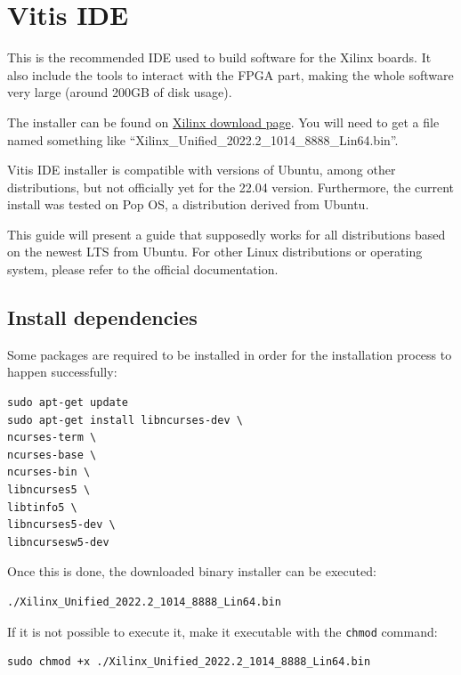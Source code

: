 \documentclass[10pt]{article}
\begin{document}
\section{Vitis IDE}
This is the recommended IDE used to build software for the Xilinx boards.
It also include the tools to interact with the FPGA part, making the whole
software very large (around 200GB of disk usage).

The installer can be found on \href{https://www.xilinx.com/support/download/index.html/content/xilinx/en/downloadNav/vitis.html}{Xilinx download page}. You will need to get
a file named something like ``Xilinx\_Unified\_2022.2\_1014\_8888\_Lin64.bin''.

Vitis IDE installer is compatible with versions of Ubuntu, among other distributions,
but not officially yet for the 22.04 version.
Furthermore, the current install was tested on Pop OS, a distribution derived from Ubuntu.

This guide will present a guide that supposedly works for all distributions based on the newest
LTS from Ubuntu. For other Linux distributions or operating system, please refer to the official documentation.


\subsection{Install dependencies}
Some packages are required to be installed in order for the installation process to happen successfully:
\begin{tcolorbox}
\begin{verbatim}
sudo apt-get update
sudo apt-get install libncurses-dev \
ncurses-term \
ncurses-base \
ncurses-bin \
libncurses5 \
libtinfo5 \
libncurses5-dev \
libncursesw5-dev
\end{verbatim}
\end{tcolorbox}

Once this is done, the downloaded binary installer can be executed:
\begin{tcolorbox}
\begin{verbatim}
./Xilinx_Unified_2022.2_1014_8888_Lin64.bin
\end{verbatim}
\end{tcolorbox}

If it is not possible to execute it, make it executable with the \verb|chmod| command:
\begin{tcolorbox}
\begin{verbatim}
sudo chmod +x ./Xilinx_Unified_2022.2_1014_8888_Lin64.bin
\end{verbatim}
\end{tcolorbox}
\end{document}
